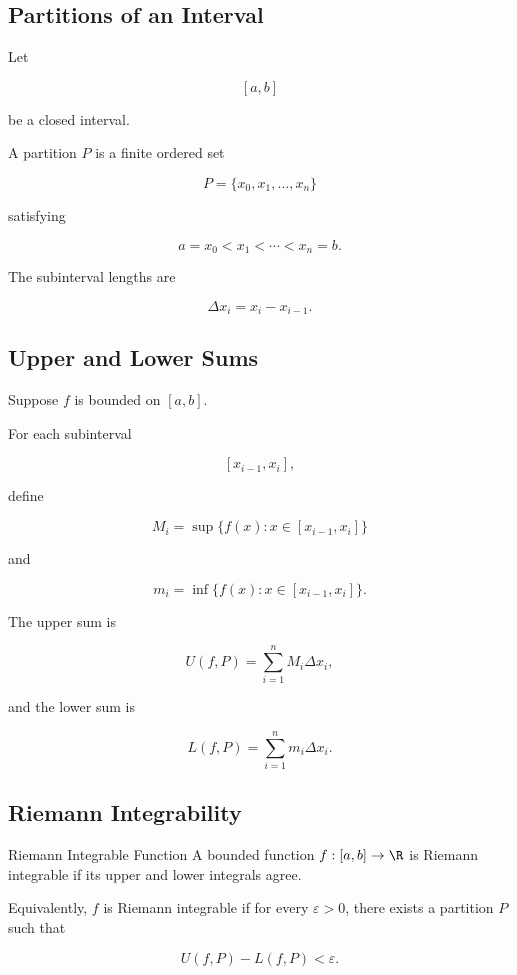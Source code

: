 \subsection{Partitions of an Interval}
\label{subsec:partitions-riemann}

Let

\[
[a,b]
\]

be a closed interval.

A partition \(P\) is a finite ordered set

\[
\boxed{
P=
\{x_0,x_1,\ldots,x_n\}
}
\]

satisfying

\[
a=x_0<x_1<\cdots<x_n=b.
\]

The subinterval lengths are

\[
\boxed{
\Delta x_i
=
x_i-x_{i-1}.
}
\]

\subsection{Upper and Lower Sums}
\label{subsec:upper-lower-riemann-sums}

Suppose \(f\) is bounded on \([a,b]\).

For each subinterval

\[
[x_{i-1},x_i],
\]

define

\[
M_i
=
\sup
\{f(x):x\in[x_{i-1},x_i]\}
\]

and

\[
m_i
=
\inf
\{f(x):x\in[x_{i-1},x_i]\}.
\]

The upper sum is

\[
\boxed{
U(f,P)
=
\sum_{i=1}^{n}
M_i\Delta x_i,
}
\]

and the lower sum is

\[
\boxed{
L(f,P)
=
\sum_{i=1}^{n}
m_i\Delta x_i.
}
\]

\subsection{Riemann Integrability}
\label{subsec:riemann-integrability}

\begin{definitionbox}{Riemann Integrable Function}
A bounded function \(f:[a,b]\to\R\) is Riemann integrable if its upper and
lower integrals agree.

Equivalently, \(f\) is Riemann integrable if for every
\(\varepsilon>0\), there exists a partition \(P\) such that

\[
\boxed{
U(f,P)-L(f,P)<\varepsilon.
}
\]
\end{definitionbox}

